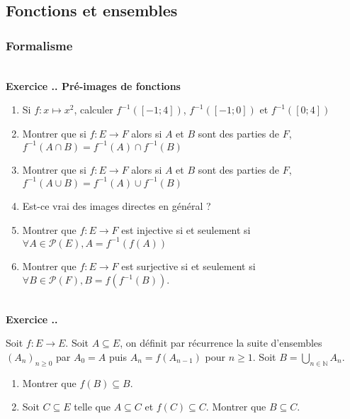 \documentclass{article}
\newcommand{\mb}[1]{\mathbb{#1}}
\newcounter{exo}
\newcommand{\exercice}[1][\null]{\textbf{\\ Exercice \thesection.\theexo. #1} \addtocounter{exo}{1}}
\begin{document}
\subsection{Fonctions et ensembles}

\subsubsection{Formalisme}

\exercice[Pré-images de fonctions]

\begin{enumerate}
    \item Si $f : x \mapsto x^2$, calculer 
        $f^{-1}( [-1;4])$, $f^{-1}([-1;0])$
        et $f^{-1}([0;4])$

    \item Montrer que si $f : E \to F$ alors 
        si $A$ et $B$ sont des parties de $F$,
        $f^{-1}(A \cap B) = f^{-1} (A) \cap f^{-1}( B)$

    \item Montrer que si $f : E \to F$ alors 
        si $A$ et $B$ sont des parties de $F$,
        $f^{-1}(A \cup B) = f^{-1} (A) \cup f^{-1}( B)$

    \item Est-ce vrai des images directes en général ?

    \item Montrer que $f : E \to F$ est injective 
        si et seulement si $\forall A \in \mathcal{P}(E),
        A = f^{-1}(f(A))$

    \item Montrer que $f : E \to F$ est surjective 
        si et seulement si $\forall B \in \mathcal{P}(F),
        B = f( f^{-1} (B))$.
\end{enumerate}



\exercice 
Soit $f : E \rightarrow E$. Soit $A \subseteq E$, on définit par récurrence la suite d'ensembles $(A_n)_{n \ge 0}$ par $A_0 = A$ puis $A_n = f(A_{n-1})$ pour $n \ge 1$. Soit $\displaystyle B = \bigcup_{n \in \mb{N}} A_n$.

\begin{enumerate}

\item Montrer que $f(B) \subseteq B$.

\item Soit $C \subseteq E$ telle que $A \subseteq C$ et $f(C) \subseteq C$. Montrer que $B \subseteq C$.
\end{enumerate}
\end{document}
